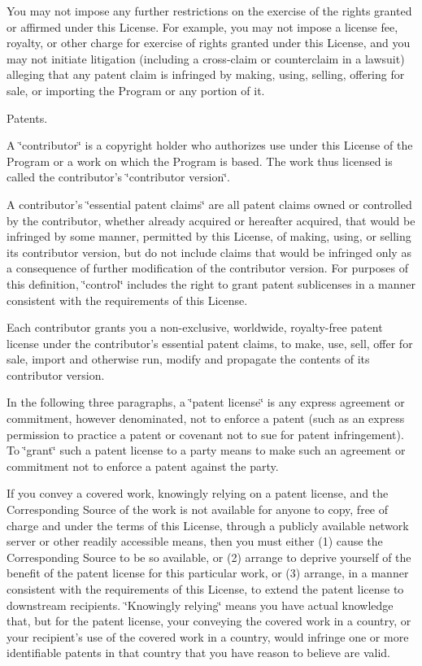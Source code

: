 You may not impose any further restrictions on the exercise of the rights granted or affirmed under this License. For example, you may not impose a license fee, royalty, or other charge for exercise of rights granted under this License, and you may not initiate litigation (including a cross-\/claim or counterclaim in a lawsuit) alleging that any patent claim is infringed by making, using, selling, offering for sale, or importing the Program or any portion of it.


\begin{DoxyEnumerate}
\item Patents.
\end{DoxyEnumerate}

A \char`\"{}contributor\char`\"{} is a copyright holder who authorizes use under this License of the Program or a work on which the Program is based. The work thus licensed is called the contributor's \char`\"{}contributor version\char`\"{}.

A contributor's \char`\"{}essential patent claims\char`\"{} are all patent claims owned or controlled by the contributor, whether already acquired or hereafter acquired, that would be infringed by some manner, permitted by this License, of making, using, or selling its contributor version, but do not include claims that would be infringed only as a consequence of further modification of the contributor version. For purposes of this definition, \char`\"{}control\char`\"{} includes the right to grant patent sublicenses in a manner consistent with the requirements of this License.

Each contributor grants you a non-\/exclusive, worldwide, royalty-\/free patent license under the contributor's essential patent claims, to make, use, sell, offer for sale, import and otherwise run, modify and propagate the contents of its contributor version.

In the following three paragraphs, a \char`\"{}patent license\char`\"{} is any express agreement or commitment, however denominated, not to enforce a patent (such as an express permission to practice a patent or covenant not to sue for patent infringement). To \char`\"{}grant\char`\"{} such a patent license to a party means to make such an agreement or commitment not to enforce a patent against the party.

If you convey a covered work, knowingly relying on a patent license, and the Corresponding Source of the work is not available for anyone to copy, free of charge and under the terms of this License, through a publicly available network server or other readily accessible means, then you must either (1) cause the Corresponding Source to be so available, or (2) arrange to deprive yourself of the benefit of the patent license for this particular work, or (3) arrange, in a manner consistent with the requirements of this License, to extend the patent license to downstream recipients. \char`\"{}\-Knowingly relying\char`\"{} means you have actual knowledge that, but for the patent license, your conveying the covered work in a country, or your recipient's use of the covered work in a country, would infringe one or more identifiable patents in that country that you have reason to believe are valid.

